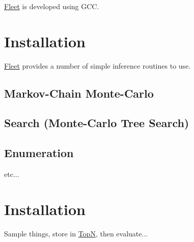 \hyperlink{class_fleet}{Fleet} is developed using G\+CC.\hypertarget{index_install_sec}{}\section{Installation}\label{index_install_sec}
\hyperlink{class_fleet}{Fleet} provides a number of simple inference routines to use.\hypertarget{index_step1}{}\subsection{Markov-\/\+Chain Monte-\/\+Carlo}\label{index_step1}
\hypertarget{index_step2}{}\subsection{Search (\+Monte-\/\+Carlo Tree Search)}\label{index_step2}
\hypertarget{index_step3}{}\subsection{Enumeration}\label{index_step3}
etc...\hypertarget{index_install_sec}{}\section{Installation}\label{index_install_sec}

\begin{DoxyItemize}
\item Sample things, store in \hyperlink{class_top_n}{TopN}, then evaluate... 
\end{DoxyItemize}